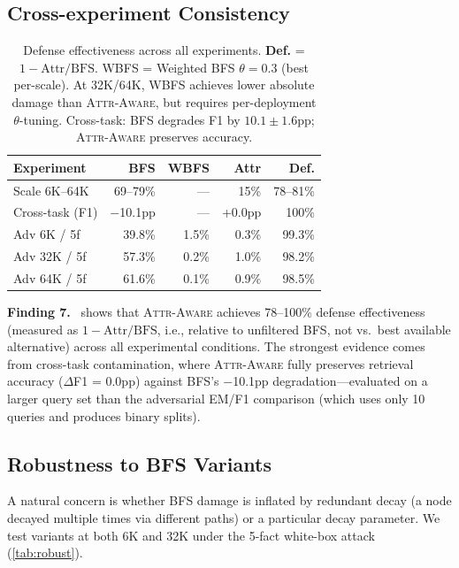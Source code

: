 \documentclass{article}
\newcommand{\attraware}{\textsc{Attr-Aware}}
\newcommand{\finding}[1]{\vspace{2pt}\noindent\textbf{Finding #1.}~}
\begin{document}
\subsection{Cross-experiment Consistency}

\begin{table}[htbp]
\centering
\footnotesize
\begin{tabular}{lrrrr}
\toprule
\textbf{Experiment} & \textbf{BFS} & \textbf{WBFS} & \textbf{Attr} & \textbf{Def.} \\
\midrule
Scale 6K--64K & 69--79\% & --- & 15\% & 78--81\% \\
Cross-task (F1) & $-$10.1pp & --- & +0.0pp & 100\% \\
Adv 6K / 5f & 39.8\% & 1.5\% & 0.3\% & 99.3\% \\
Adv 32K / 5f & 57.3\% & 0.2\% & 1.0\% & 98.2\% \\
Adv 64K / 5f & 61.6\% & 0.1\% & 0.9\% & 98.5\% \\
\bottomrule
\end{tabular}
\caption{Defense effectiveness across all experiments. \textbf{Def.} = $1 - \text{Attr}/\text{BFS}$. WBFS = Weighted BFS $\theta{=}0.3$ (best per-scale). At 32K/64K, WBFS achieves lower absolute damage than \attraware{}, but requires per-deployment $\theta$-tuning. Cross-task: BFS degrades F1 by $10.1\pm1.6$pp; \attraware{} preserves accuracy.}
\label{tab:defense_all}
\end{table}

\finding{7}  shows that \attraware{} achieves 78--100\% defense effectiveness (measured as $1 - \text{Attr}/\text{BFS}$, i.e., relative to unfiltered BFS, not vs.\ best available alternative) across all experimental conditions.
The strongest evidence comes from cross-task contamination, where \attraware{} fully preserves retrieval accuracy ($\Delta$F1 = 0.0pp) against BFS's $-$10.1pp degradation---evaluated on a larger query set than the adversarial EM/F1 comparison (which uses only 10 queries and produces binary splits).

\subsection{Robustness to BFS Variants}

A natural concern is whether BFS damage is inflated by redundant decay (a node decayed multiple times via different paths) or a particular decay parameter.
We test variants at both 6K and 32K under the 5-fact white-box attack (\cref{tab:robust}).
\end{document}
